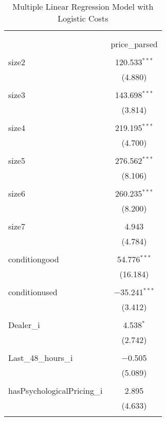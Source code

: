 
\begin{table}[H] \centering 
  \caption{Multiple Linear Regression Model with Logistic Costs} 
  \label{tab:mlr_model_2} 
\begin{tabular}{@{\extracolsep{5pt}}lc} 
\\[-1.8ex]\hline 
\hline \\[-1.8ex] 
\\[-1.8ex] & price\_parsed \\ 
\hline \\[-1.8ex] 
 size2 & 120.533$^{***}$ \\ 
  & (4.880) \\ 
  & \\ 
 size3 & 143.698$^{***}$ \\ 
  & (3.814) \\ 
  & \\ 
 size4 & 219.195$^{***}$ \\ 
  & (4.700) \\ 
  & \\ 
 size5 & 276.562$^{***}$ \\ 
  & (8.106) \\ 
  & \\ 
 size6 & 260.235$^{***}$ \\ 
  & (8.200) \\ 
  & \\ 
 size7 & 4.943 \\ 
  & (4.784) \\ 
  & \\ 
 conditiongood & 54.776$^{***}$ \\ 
  & (16.184) \\ 
  & \\ 
 conditionused & $-$35.241$^{***}$ \\ 
  & (3.412) \\ 
  & \\ 
 Dealer\_i & 4.538$^{*}$ \\ 
  & (2.742) \\ 
  & \\ 
 Last\_48\_hours\_i & $-$0.505 \\ 
  & (5.089) \\ 
  & \\ 
 hasPsychologicalPricing\_i & 2.895 \\ 
  & (4.633) \\ 
  & \\ 

\end{tabular}
\end{table}
